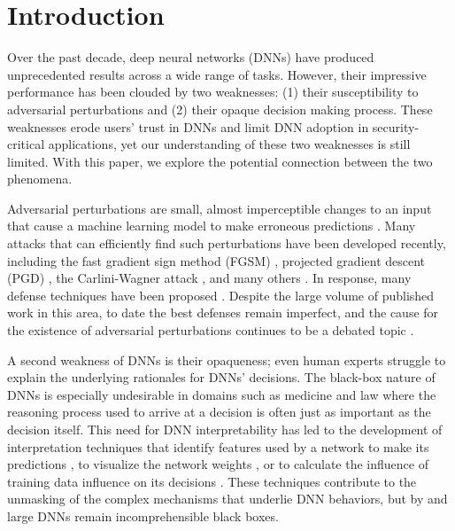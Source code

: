 \section{Introduction} \label{sec:intro}
Over the past decade, deep neural networks (DNNs) have produced unprecedented results across a wide range of tasks. However, their impressive performance has been clouded by two weaknesses: (1) their susceptibility to adversarial perturbations and (2) their opaque decision making process.
These weaknesses erode users' trust in DNNs and limit DNN adoption in security-critical applications, yet our understanding of these two weaknesses is still limited. With this paper, we explore the potential connection between the two phenomena.  

Adversarial perturbations are small, almost imperceptible changes to an input that cause a machine learning model to make erroneous predictions \cite{intriguing_properties_dnns}. Many attacks that can efficiently find such perturbations have been developed recently, including the fast gradient sign method (FGSM) \cite{explaining_harnessing_adv_egs}, projected gradient descent (PGD) \cite{toward_robust_dnn}, the Carlini-Wagner attack \cite{cw}, and many others \cite{blackbox_attack,Brendel2017:Decision-based-attacks,universal-perturbations2017,Chen2017:zoo}.
In response, many defense techniques have been proposed \cite{explaining_harnessing_adv_egs,distillation,input_grad_reg,double_bp,lipschitz_converge_generalize,jacobian_reg,smoothing}. Despite the large volume of published work in this area, to date the best defenses remain imperfect, and the cause for the existence of adversarial perturbations continues to be a debated topic \cite{Gilmer2018,Schmidt2018,Bubeck2018,Nakkiran2019,ilyas2019adversarial}.

A second weakness of DNNs is their opaqueness; even human experts struggle to explain the underlying rationales for DNNs' decisions. The black-box nature of DNNs is especially undesirable in domains such as medicine and law where the reasoning process used to arrive at a decision is often just as important as the decision itself. This need for DNN interpretability has led to the development of interpretation techniques that identify features used by a network to make its predictions \cite{smoothgrad,deeplift,ahern2019normlime}, to visualize the network weights \cite{Zeiler2014,BoleiZhou2015,NetDissection2017,fong2018}, or to calculate the influence of training data influence on its decisions \cite{Koh2017:influence-functions}. These techniques contribute to the unmasking of the complex mechanisms that underlie DNN behaviors, but by and large DNNs remain incomprehensible black boxes.


